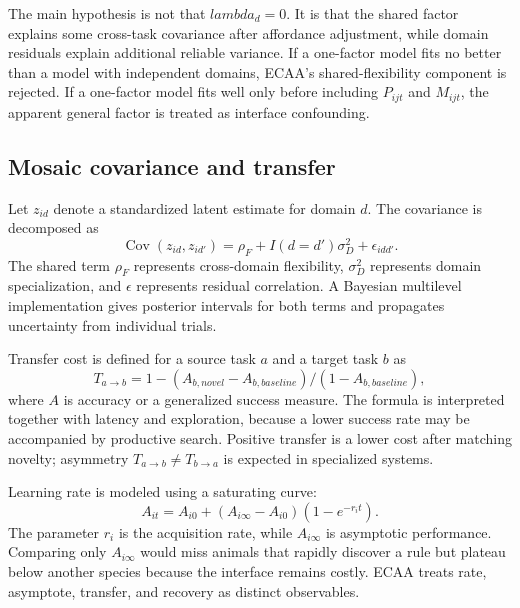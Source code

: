 \documentclass[conference]{IEEEtran}
\begin{document}
The main hypothesis is not that $lambda_d=0$. It is that the shared factor explains some cross-task covariance after affordance adjustment, while domain residuals explain additional reliable variance. If a one-factor model fits no better than a model with independent domains, ECAA's shared-flexibility component is rejected. If a one-factor model fits well only before including $P_{ijt}$ and $M_{ijt}$, the apparent general factor is treated as interface confounding.

\subsection{Mosaic covariance and transfer}
Let $z_{id}$ denote a standardized latent estimate for domain $d$. The covariance is decomposed as
\begin{equation}
\operatorname{Cov}(z_{id},z_{id'}) =
\rho_F + I(d=d')\sigma_D^2 + \epsilon_{idd'}.
\label{eq:covariance}
\end{equation}
The shared term $\rho_F$ represents cross-domain flexibility, $\sigma_D^2$ represents domain specialization, and $\epsilon$ represents residual correlation. A Bayesian multilevel implementation gives posterior intervals for both terms and propagates uncertainty from individual trials.

Transfer cost is defined for a source task $a$ and a target task $b$ as
\begin{equation}
T_{a\rightarrow b} =
1 - (A_{b,novel}-A_{b,baseline})/(1-A_{b,baseline}),
\label{eq:transfer}
\end{equation}
where $A$ is accuracy or a generalized success measure. The formula is interpreted together with latency and exploration, because a lower success rate may be accompanied by productive search. Positive transfer is a lower cost after matching novelty; asymmetry $T_{a\rightarrow b}\neq T_{b\rightarrow a}$ is expected in specialized systems.

Learning rate is modeled using a saturating curve:
\begin{equation}
A_{it}=A_{i0}+(A_{i\infty}-A_{i0})(1-e^{-r_i t}).
\label{eq:learning}
\end{equation}
The parameter $r_i$ is the acquisition rate, while $A_{i\infty}$ is asymptotic performance. Comparing only $A_{i\infty}$ would miss animals that rapidly discover a rule but plateau below another species because the interface remains costly. ECAA treats rate, asymptote, transfer, and recovery as distinct observables.
\end{document}

